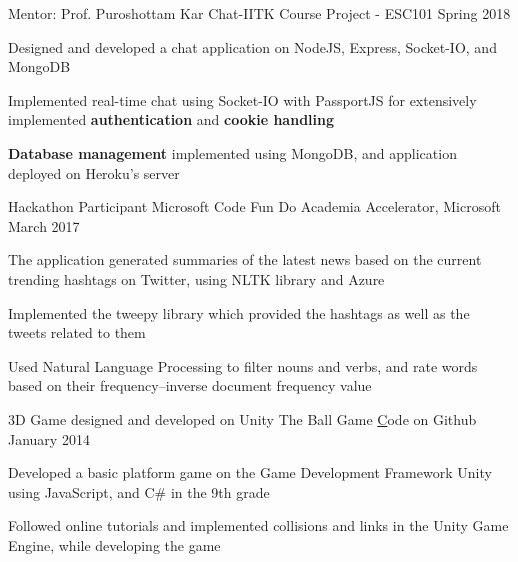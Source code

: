 
\begin{cventries}

  \cventry
    {Mentor: Prof. Puroshottam Kar}
    {Chat-IITK}
    {Course Project - ESC101}
    {Spring 2018}
    {
      \begin{cvitems}
        \item {Designed and developed a chat application on NodeJS, Express, Socket-IO, and MongoDB}
        \item {Implemented real-time chat using Socket-IO with PassportJS for extensively implemented \textbf{authentication} and \textbf{cookie handling}}
        \item {\textbf{Database management} implemented using MongoDB, and application deployed on Heroku's server}
      \end{cvitems}
    }

  \cventry
    {Hackathon Participant}
    {Microsoft Code Fun Do} 
    {Academia Accelerator, Microsoft}
    {March 2017}
    {
      \begin{cvitems} 
        \item {The application generated summaries of the latest news based on the current trending hashtags on Twitter, using NLTK library and Azure}
        \item {Implemented the tweepy library which provided the hashtags as well as the tweets related to them}
        \item {Used Natural Language Processing to filter nouns and verbs, and rate words based on their frequency–inverse document frequency value}
      \end{cvitems}
    }

  \cventry
    {3D Game designed and developed on Unity} 
    {The Ball Game} 
    {\href{https://github.com/7ayushgupta/UnityGame}Code on Github}
    {January 2014}
    {
      \begin{cvitems}
        \item {Developed a basic platform game on the Game Development Framework Unity using JavaScript, and C\# in the 9th grade}
        \item {Followed online tutorials and implemented collisions and links in the Unity Game Engine, while developing the game}
      \end{cvitems}
    }

\end{cventries}
